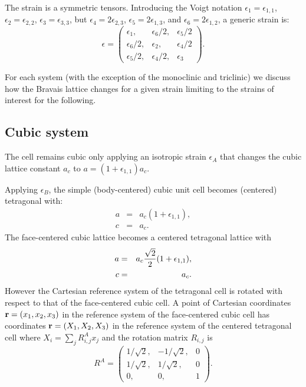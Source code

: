 \documentclass[12pt,a4paper]{article}
\begin{document}
The strain is a symmetric tensors. Introducing the Voigt notation 
$\epsilon_1=\epsilon_{1,1}$,
$\epsilon_2=\epsilon_{2,2}$, $\epsilon_3=\epsilon_{3,3}$, but
$\epsilon_4=2 \epsilon_{2,3}$, $\epsilon_5=2 \epsilon_{1,3}$, and
$\epsilon_6=2 \epsilon_{1,2}$, a generic strain is:
\begin{equation}
\epsilon=\left( \begin{array}{ccc}
\epsilon_1, & \epsilon_6/2, & \epsilon_5/2 
\\
\epsilon_6/2, & \epsilon_2, & \epsilon_4/2  
\\
\epsilon_5/2, & \epsilon_4/2, & \epsilon_{3}
\end{array}
\right).
\end{equation}

For each system (with the exception of the monoclinic and triclinic) 
we discuss how the Bravais lattice changes for a given strain limiting
to the strains of interest for the following.

\subsection{\color{web-blue}Cubic system}
The cell remains cubic only applying an isotropic strain $\epsilon_A$ that 
changes the cubic lattice constant $a_c$ to $a=(1+\epsilon_{1,1})a_c$.

Applying $\epsilon_B$, the simple (body-centered) cubic
unit cell becomes (centered) tetragonal with:
\begin{eqnarray}
a&=&a_c (1+\epsilon_{1,1}), \\
c&=&a_c.
\end{eqnarray}
The face-centered cubic lattice becomes a centered tetragonal lattice with
\begin{eqnarray}
a&=&a_c {\sqrt{2} \over 2} (1+\epsilon_{1,1}), \\
c&=&a_c.
\end{eqnarray}
However the Cartesian reference system of the tetragonal cell
is rotated with respect to that of the face-centered cubic cell. 
A point of Cartesian coordinates ${\bf r}=(x_1,x_2,x_3)$ 
in the reference system of the face-centered cubic cell 
has coordinates 
${\bf r}=(X_1,X_2,X_3)$ in the reference system of the centered tetragonal cell
where $X_i=\sum_j R^A_{i,j} x_j$ and the rotation matrix $R_{i,j}$ is 
\begin{equation}
R^A=\left( \begin{array}{ccc}
1/\sqrt{2}, & -1/\sqrt{2}, & 0 
\\
1/\sqrt{2}, & 1/\sqrt{2}, & 0 
\\
0, & 0, & 1
\end{array}
\right).
\end{equation}
\end{document}
